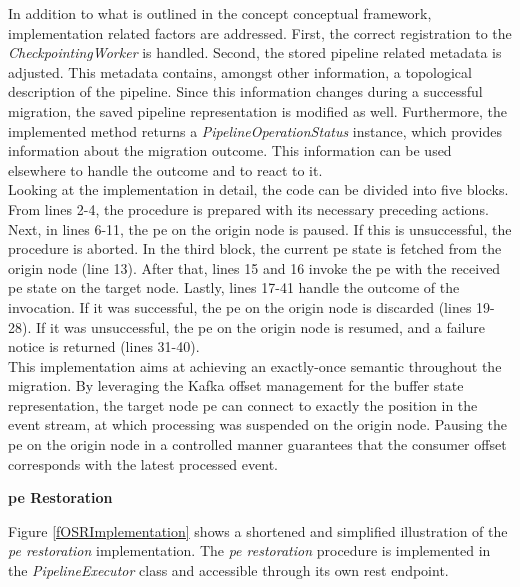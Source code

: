 In addition to what is outlined in the concept conceptual framework, implementation related factors are addressed. First, the correct registration to the \textit{CheckpointingWorker} is handled. Second, the stored pipeline related metadata is adjusted. This metadata contains, amongst other information, a topological description of the pipeline. Since this information changes during a successful migration, the saved pipeline representation is modified as well. Furthermore, the implemented method returns a \textit{PipelineOperationStatus} instance, which provides information about the migration outcome. This information can be used elsewhere to handle the outcome and to react to it.\\
Looking at the implementation in detail, the code can be divided into five blocks. From lines 2-4, the procedure is prepared with its necessary preceding actions. Next, in lines 6-11, the \gls{pe} on the origin node is paused. If this is unsuccessful, the procedure is aborted. In the third block, the current \gls{pe} state is fetched from the origin node (line 13). After that, lines 15 and 16 invoke the \gls{pe} with the received \gls{pe} state on the target node. Lastly, lines 17-41 handle the outcome of the invocation. If it was successful, the \gls{pe} on the origin node is discarded (lines 19-28). If it was unsuccessful, the \gls{pe} on the origin node is resumed, and a failure notice is returned (lines 31-40).\\
This implementation aims at achieving an exactly-once semantic throughout the migration. By leveraging the Kafka offset management for the buffer state representation, the target node \gls{pe} can connect to exactly the position in the event stream, at which processing was suspended on the origin node. Pausing the \gls{pe} on the origin node in a controlled manner guarantees that the consumer offset corresponds with the latest processed event.\par



\textbf{\acrlong{pe} Restoration}\par

Figure \ref{fOSRImplementation} shows a shortened and simplified illustration of the \textit{\acrshort{pe} restoration} implementation. The \textit{\acrshort{pe} restoration} procedure is implemented in the \textit{PipelineExecutor} class and accessible through its own \gls{rest} endpoint.\par

